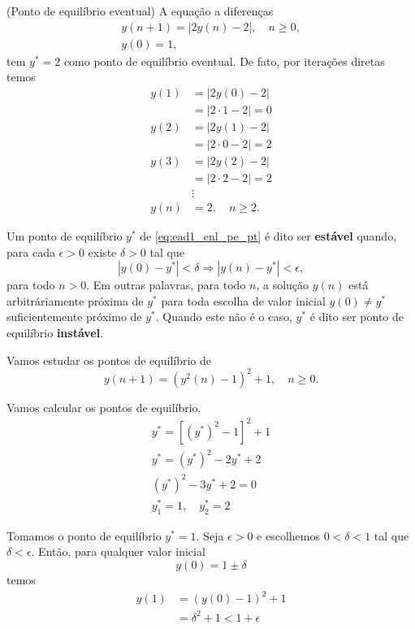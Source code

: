 \begin{ex}(Ponto de equilíbrio eventual)
  A equação a diferenças
  \begin{align}
    y(n+1) = |2y(n)-2|,\quad n\geq 0,\\
    y(0) = 1,
  \end{align}
  tem $y^* = 2$ como ponto de equilíbrio eventual. De fato, por iterações diretas temos
  \begin{align}
    y(1) &= |2y(0)-2| \\
         &= |2\cdot 1 - 2| = 0 \\
    y(2) &= |2y(1)-2| \\
         &= |2\cdot 0 - 2| = 2 \\
    y(3) &= |2y(2) - 2| \\
         &= |2\cdot 2 - 2| = 2 \\
         &\vdots \\
    y(n) &= 2,\quad n\geq 2.
  \end{align}
\end{ex}

Um ponto de equilíbrio $y^*$ de \eqref{eq:ead1_enl_pe_pt} é dito ser {\bf estável} quando, para cada $\epsilon>0$ existe $\delta>0$ tal que
\begin{equation}
  |y(0)-y^*|<\delta \Rightarrow |y(n)-y^*|<\epsilon,
\end{equation}
para todo $n>0$. Em outras palavras, para todo $n$, a solução $y(n)$ está arbitráriamente próxima de $y^*$ para toda escolha de valor inicial $y(0)\neq y^*$ suficientemente próximo de $y^*$. Quando este não é o caso, $y^*$ é dito ser ponto de equilíbrio {\bf instável}.

\begin{ex}
  Vamos estudar os pontos de equilíbrio de
  \begin{equation}
    y(n+1) = \left(y^2(n)-1\right)^2 + 1,\quad n\geq 0.
  \end{equation}

  Vamos calcular os pontos de equilíbrio.
  \begin{gather}
    y^* = \left[\left(y^*\right)^2-1\right]^2 + 1 \\
    y^* = \left(y^*\right)^2 - 2y^* + 2 \\
    \left(y^*\right)^2 - 3y^* + 2 = 0 \\
    y_1^* = 1,\quad y_2^* = 2
  \end{gather}

  Tomamos o ponto de equilíbrio $y^*=1$. Seja $\epsilon > 0$ e escolhemos $0<\delta<1$ tal que $\delta<\epsilon$. Então, para qualquer valor inicial
  \begin{equation}
    y(0) = 1 \pm \delta
  \end{equation}
  temos
  \begin{align}
    y(1) &= \left(y(0)-1\right)^2+1\\
         &= \delta^2 + 1 < 1 + \epsilon
  \end{align}
\end{ex}


